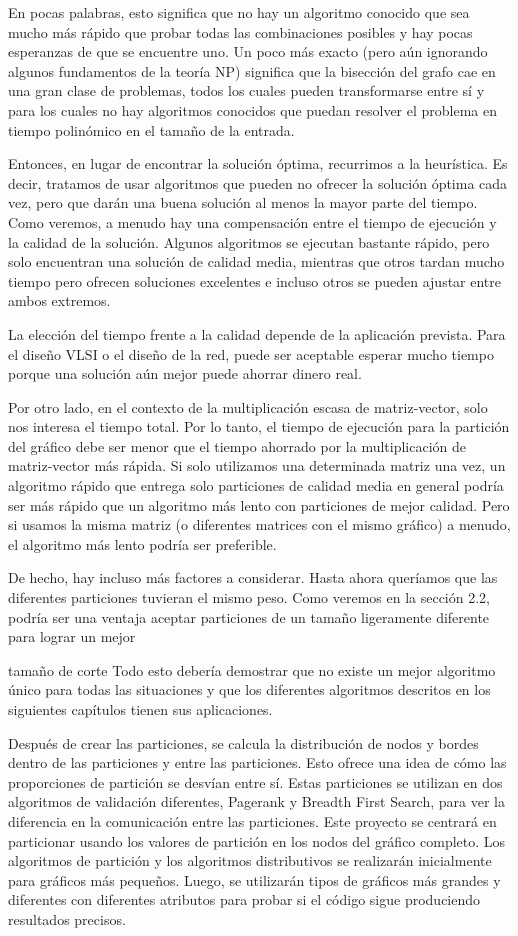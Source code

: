En pocas palabras, esto significa que no hay un algoritmo conocido que sea mucho más rápido que probar todas las combinaciones posibles y hay pocas esperanzas de que se encuentre uno. Un poco más exacto (pero aún ignorando algunos fundamentos de la teoría NP) significa que la bisección del grafo cae en una gran clase de problemas, todos los cuales pueden transformarse entre sí y para los cuales no hay algoritmos conocidos que puedan resolver el problema en tiempo polinómico en el tamaño de la entrada.

Entonces, en lugar de encontrar la solución óptima, recurrimos a la heurística. Es decir, tratamos de usar algoritmos que pueden no ofrecer la solución óptima cada vez, pero que darán una buena solución al menos la mayor parte del tiempo. Como veremos, a menudo hay una compensación entre el tiempo de ejecución y la calidad de la solución. Algunos algoritmos se ejecutan bastante rápido, pero solo encuentran una solución de calidad media, mientras que otros tardan mucho tiempo pero ofrecen soluciones excelentes e incluso otros se pueden ajustar entre ambos extremos.

La elección del tiempo frente a la calidad depende de la aplicación prevista. Para el diseño VLSI o el diseño de la red, puede ser aceptable esperar mucho tiempo porque una solución aún mejor puede ahorrar dinero real.

Por otro lado, en el contexto de la multiplicación escasa de matriz-vector, solo nos interesa el tiempo total. Por lo tanto, el tiempo de ejecución para la partición del gráfico debe ser menor que el tiempo ahorrado por la multiplicación de matriz-vector más rápida.
Si solo utilizamos una determinada matriz una vez, un algoritmo rápido que entrega solo particiones de calidad media en general podría ser más rápido que un algoritmo más lento con particiones de mejor calidad. Pero si usamos la misma matriz (o diferentes matrices con el mismo gráfico) a menudo, el algoritmo más lento podría ser preferible.

De hecho, hay incluso más factores a considerar. Hasta ahora queríamos que las diferentes particiones tuvieran el mismo peso. Como veremos en la sección 2.2, podría ser una ventaja aceptar particiones de un tamaño ligeramente diferente para lograr un mejor

tamaño de corte
Todo esto debería demostrar que no existe un mejor algoritmo único para todas las situaciones y que los diferentes algoritmos descritos en los siguientes capítulos tienen sus aplicaciones.


Después de crear las particiones, se calcula la distribución de nodos y bordes dentro de las particiones y entre las particiones. Esto ofrece una idea de cómo las proporciones de partición se desvían entre sí. Estas particiones se utilizan en dos algoritmos de validación diferentes, Pagerank y Breadth First Search, para ver la diferencia en la comunicación entre las particiones.
Este proyecto se centrará en particionar usando los valores de partición en los nodos del gráfico completo.
Los algoritmos de partición y los algoritmos distributivos se realizarán inicialmente para gráficos más pequeños. Luego, se utilizarán tipos de gráficos más grandes y diferentes con diferentes atributos para probar si el código
sigue produciendo resultados precisos.
